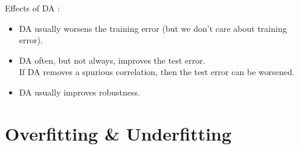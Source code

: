 \documentclass{report}
\begin{document}
\begin{definition}
    Effects of DA :

    \begin{itemize}
        \item DA usually worsens the training error (but we don't care about training error).
        \item
        DA often, but not always, improves the test error.\\

        If DA removes a spurious correlation, then the test error can be worsened.
        \item DA usually improves robustness.
    \end{itemize}
\end{definition}

\section{Overfitting \& Underfitting}
\end{document}
